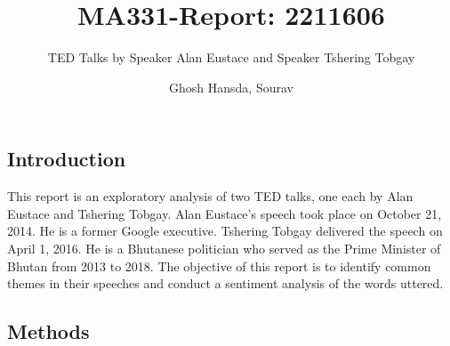 \documentclass[
]{article}
\title{MA331-Report: 2211606}
\subtitle{TED Talks by Speaker Alan Eustace and Speaker Tshering Tobgay}
\author{Ghosh Hansda, Sourav}
\date{}
\begin{document}
\maketitle

\hypertarget{introduction}{%
\subsection{Introduction}\label{introduction}}

This report is an exploratory analysis of two TED talks, one each by
Alan Eustace and Tshering Tobgay. Alan Eustace's speech took place on
October 21, 2014. He is a former Google executive. Tshering Tobgay
delivered the speech on April 1, 2016. He is a Bhutanese politician who
served as the Prime Minister of Bhutan from 2013 to 2018. The objective
of this report is to identify common themes in their speeches and
conduct a sentiment analysis of the words uttered.

\hypertarget{methods}{%
\subsection{Methods}\label{methods}}
\end{document}
